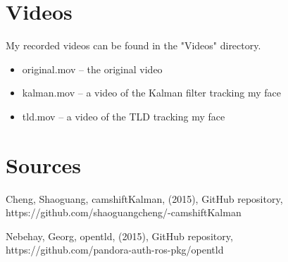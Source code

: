 \documentclass[paper=a4, fontsize=11pt]{scrartcl} %
\numberwithin{equation}{section} %
\numberwithin{figure}{section} %
\numberwithin{table}{section} %
\begin{document}
\section{Videos}

My recorded videos can be found in the "Videos" directory.

\begin{itemize}
  \item original.mov -- the original video
  \item kalman.mov -- a video of the Kalman filter tracking my face
  \item tld.mov -- a video of the TLD tracking my face
\end{itemize}

\section{Sources}

Cheng, Shaoguang, camshiftKalman, (2015), GitHub repository, https://github.com/shaoguangcheng/-camshiftKalman

Nebehay, Georg, open\textunderscore tld, (2015), GitHub repository, https://github.com/pandora-auth-ros-pkg/open\textunderscore tld
\end{document}
